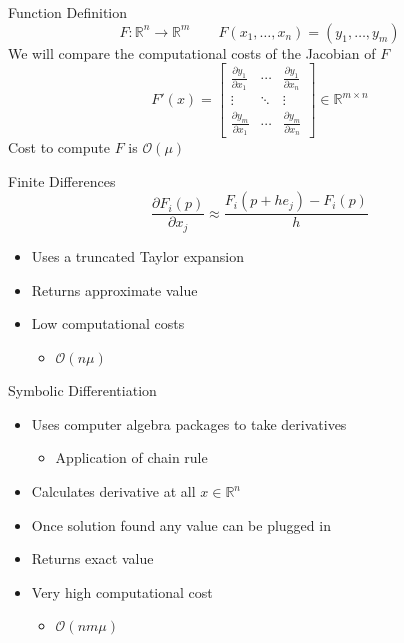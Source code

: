 \documentclass{beamer}
\begin{document}
\begin{frame}{Function Definition}
    \begin{equation*}
            F: \mathbb{R}^n \longrightarrow \mathbb{R}^m \qquad
            F(x_1, \ldots, x_n) = (y_1, \ldots, y_m)
    \end{equation*}
    We will compare the computational costs of the Jacobian of $F$
    \begin{equation*} \label{jacobian}
        F'(x) = \begin{bmatrix}
            \frac{\partial y_1}{\partial x_1} & \cdots & \frac{\partial y_1}{\partial x_n} \\
            \vdots & \ddots & \vdots \\
            \frac{\partial y_m}{\partial x_1} & \cdots & \frac{\partial y_m}{\partial x_n}
        \end{bmatrix} \in \mathbb{R}^{m \times n}
    \end{equation*}
    Cost to compute $F$ is $\mathcal{O}(\mu)$
\end{frame}


\begin{frame}{Finite Differences}
    \begin{equation*}
        \frac{\partial F_i (p)}{\partial x_j} \approx \frac{F_i(p+he_j) - F_i(p)}{h}
    \end{equation*}
    \begin{itemize}
        \item Uses a truncated Taylor expansion 
        \item Returns \alert{approximate} value
        \item Low computational costs
        \begin{itemize}
            \item $\mathcal{O}(n \mu)$
        \end{itemize}
    \end{itemize}
\end{frame}

\begin{frame}{Symbolic Differentiation}
    \begin{itemize}
        \item Uses computer algebra packages to take derivatives
        \begin{itemize}
            \item Application of chain rule
        \end{itemize}
        \item Calculates derivative at all $x \in \mathbb{R}^n$
        \item Once solution found any value can be plugged in
        \item Returns \alert{exact} value
        \item Very high computational cost
        \begin{itemize}
            \item $\mathcal{O}(nm \mu)$
        \end{itemize}
    \end{itemize}
\end{frame}
\end{document}
